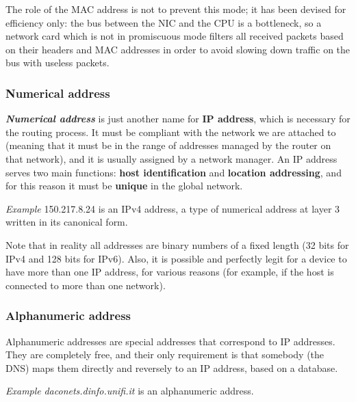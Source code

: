 The role of the MAC address is not to prevent this mode; it has been devised for efficiency only: the bus between the NIC and the CPU is a bottleneck, so a network card which is not in promiscuous mode filters all received packets based on their headers and MAC addresses in order to avoid slowing down traffic on the bus with useless packets.


\subsubsection{Numerical address}
\textit{\textbf{Numerical address}} is just another name for \textbf{IP address}, which is necessary for the routing process. It must be compliant with the network we are attached to (meaning that it must be in the range of addresses managed by the router on that network), and it is usually assigned by a network manager. An IP address serves two main functions: \textbf{host identification} and \textbf{location addressing}, and for this reason it must be \textbf{unique} in the global network.

\vspace{0.5em}

\emph{Example} 150.217.8.24 is an IPv4 address, a type of numerical address at layer 3 written in its canonical form.

\vspace{0.5em}

Note that in reality all addresses are binary numbers of a fixed length (32 bits for IPv4 and 128 bits for IPv6). Also, it is possible and perfectly legit for a device to have more than one IP address, for various reasons (for example, if the host is connected to more than one network).


\subsubsection{Alphanumeric address}
Alphanumeric addresses are special addresses that correspond to IP addresses. They are completely free, and their only requirement is that somebody (the DNS) maps them directly and reversely to an IP address, based on a database.

\vspace{0.5em}

\emph{Example} \textit{daconets.dinfo.unifi.it} is an alphanumeric address.

